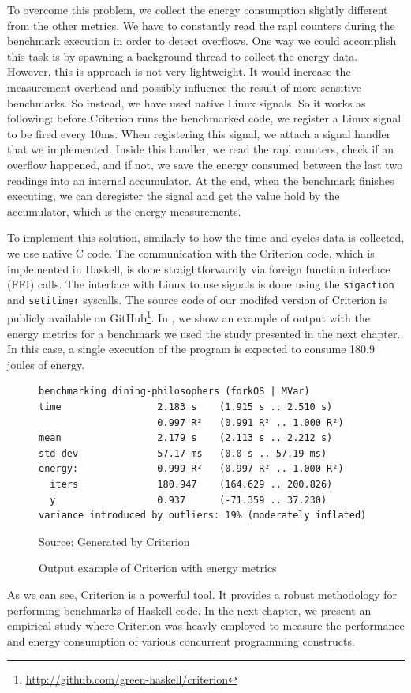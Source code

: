 To overcome this problem, we collect the energy consumption slightly different from the other metrics. We have to constantly read the \ac{rapl} counters during the benchmark execution in order to detect overflows. One way we could accomplish this task is by spawning a background thread to collect the energy data. However, this is approach is not very lightweight. It would increase the measurement overhead and possibly influence the result of more sensitive benchmarks. So instead, we have used native Linux signals. So it works as following: before Criterion runs the benchmarked code, we register a Linux signal to be fired every 10ms. When registering this signal, we attach a signal handler that we implemented. Inside this handler, we read the \ac{rapl} counters, check if an overflow happened, and if not, we save the energy consumed between the last two readings into an internal accumulator. At the end, when the benchmark finishes executing, we can deregister the signal and get the value hold by the accumulator, which is the energy measurements.

To implement this solution, similarly to how the time and cycles data is collected, we use native C code. The communication with the Criterion code, which is implemented in Haskell, is done straightforwardly via foreign function interface (FFI) calls. The interface with Linux to use signals is done using the \texttt{sigaction} and \texttt{setitimer} syscalls. The source code of our modifed version of Criterion is publicly available on GitHub\footnote{\url{http://github.com/green-haskell/criterion}}. In , we show an example of output with the energy metrics for a benchmark we used the study presented in the next chapter. In this case, a single execution of the program is expected to consume 180.9 joules of energy.

\begin{figure}[htp]
  \centering
  \caption{Output example of Criterion with energy metrics}
	\begin{verbatim}
benchmarking dining-philosophers (forkOS | MVar)
time                 2.183 s    (1.915 s .. 2.510 s)
                     0.997 R²   (0.991 R² .. 1.000 R²)
mean                 2.179 s    (2.113 s .. 2.212 s)
std dev              57.17 ms   (0.0 s .. 57.19 ms)
energy:              0.999 R²   (0.997 R² .. 1.000 R²)
  iters              180.947    (164.629 .. 200.826)
  y                  0.937      (-71.359 .. 37.230)
variance introduced by outliers: 19% (moderately inflated)
  \end{verbatim}
  \footnotesize{Source: Generated by Criterion}
  \label{fig:fib-energy-output}
\end{figure}

As we can see, Criterion is a powerful tool. It provides a robust methodology for performing benchmarks of Haskell code. In the next chapter, we present an empirical study where Criterion was heavly employed to measure the performance and energy consumption of various concurrent programming constructs.
